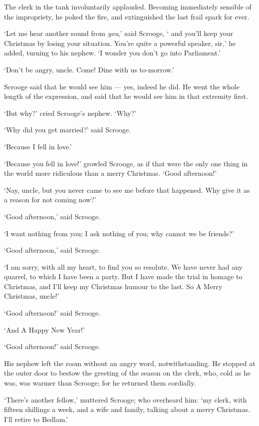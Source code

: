 \documentclass[11pt,twoside]{article}\makeatletter
\begin{document}
The clerk in the tank involuntarily applauded.  Becoming immediately sensible of the impropriety, he poked the fire, and extinguished the last frail spark for ever.  \par
‘Let me hear another sound from \textit{you},’ said Scrooge,  ‘ and you'll keep your Christmas by losing your situation. You're quite a powerful speaker, sir,’ he added, turning to his nephew.  ‘I wonder you don't go into Parliament.’  \par
           ‘Don't be angry, uncle.  Come!  Dine with us to-morrow.’         \par
Scrooge said that he would see him — yes, indeed he did. He went the whole length of the expression, and said that he would see him in that extremity first.  \par
‘But why?’ cried Scrooge's nephew.  ‘Why?’  \par
‘Why did you get married?’ said Scrooge.  \par
           ‘Because I fell in love.’         \par
‘Because you fell in love!’ growled Scrooge, as if that were the only one thing in the world more ridiculous than a merry Christmas.  ‘Good afternoon!’  \par
           ‘Nay, uncle, but you never came to see me before that happened.  Why give it as a reason for not coming now?’         \par
‘Good afternoon,’ said Scrooge.  \par
           ‘I want nothing from you; I ask nothing of you; why cannot we be friends?’         \par
‘Good afternoon,’ said Scrooge.  \par
           ‘I am sorry, with all my heart, to find you so resolute. We have never had any quarrel, to which I have been a party.  But I have made the trial in homage to Christmas, and I'll keep my Christmas humour to the last.  So A Merry Christmas, uncle!’         \par
‘Good afternoon!’ said Scrooge.  \par
           ‘And A Happy New Year!’         \par
‘Good afternoon!’ said Scrooge.  \par
His nephew left the room without an angry word, notwithstanding. He stopped at the outer door to bestow the greeting of the season on the clerk, who, cold as he was, was warmer than Scrooge; for he returned them cordially.  \par
‘There's another fellow,’ muttered Scrooge; who overheard him: ‘my clerk, with fifteen shillings a week, and a wife and family, talking about a merry Christmas.  I'll retire to Bedlam.’  \par
\end{document}
